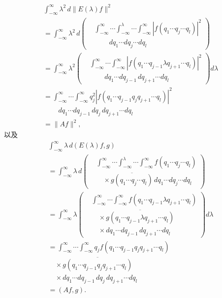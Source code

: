 \documentclass[fontsize=13pt,twoside,openany,headings=normal,parskip=false,bookmarkpackage=false,DIV=calc]{scrbook}
\begin{document}
\begin{align*}
&\int_{-\infty}^{\infty}\lambda^2\,d\|E(\lambda)f\|^2\\
&=\int_{-\infty}^{\infty}\lambda^2\,d\left(\begin{aligned}
&\int_{-\infty}^{\infty}\cdots\int_{-\infty}^{\lambda}\cdots\int_{-\infty}^{\infty}|f(q_1\cdots q_j\cdots q_l)|^2\\
&\qquad{}\,dq_1\cdots dq_j\cdots dq_l
\end{aligned}\right)\\
&=\int_{-\infty}^{\infty}\lambda^2\left(\begin{aligned}
&\int_{-\infty}^{\infty}\cdots\int_{-\infty}^{\infty}|f(q_1\cdots q_{j-1}\lambda q_{j+1}\cdots q_l)|^2\\
&\qquad{}\,dq_1\cdots dq_{j-1}\,dq_{j+1}\cdots dq_l
\end{aligned}\right)d\lambda\\
&=\int_{-\infty}^{\infty}\cdots\int_{-\infty}^{\infty}q_j^2|f(q_1\cdots q_{j-1}q_jq_{j+1}\cdots q_l)|^2\\
&\qquad{}\,dq_1\cdots dq_{j-1}\,dq_j\,dq_{j+1}\cdots dq_l\\
&=\|Af\|^2,
\end{align*}
以及
\begin{align*}
&\int_{-\infty}^{\infty}\lambda\,d(E(\lambda)f,g)\\
&=\int_{-\infty}^{\infty}\lambda\,d\left(\begin{aligned}
&\int_{-\infty}^{\infty}\cdots\int_{-\infty}^{\lambda}\cdots\int_{-\infty}^{\infty}f(q_1\cdots q_j\cdots q_l)\\
&\quad\times\overline{g(q_1\cdots q_j\cdots q_l)}\,dq_1\cdots dq_j\cdots dq_l
\end{aligned}\right)\\
&=\int_{-\infty}^{\infty}\lambda\left(\begin{aligned}
&\int_{-\infty}^{\infty}\cdots\int_{-\infty}^{\infty}f(q_1\cdots q_{j-1}\lambda q_{j+1}\cdots q_l)\\
&\quad\times\overline{g(q_1\cdots q_{j-1}\lambda q_{j+1}\cdots q_l)}\\
&\quad\times dq_1\cdots dq_{j-1}\,dq_{j+1}\cdots dq_l
\end{aligned}\right)d\lambda\\
&=\int_{-\infty}^{\infty}\cdots\int_{-\infty}^{\infty}q_jf(q_1\cdots q_{j-1}q_jq_{j+1}\cdots q_l)\\
&\quad\times\overline{g(q_1\cdots q_{j-1}q_jq_{j+1}\cdots q_l)}\\
&\quad\times dq_1\cdots dq_{j-1}\,dq_j\,dq_{j+1}\cdots dq_l\\
&=(Af,g).
\end{align*}
\end{document}
